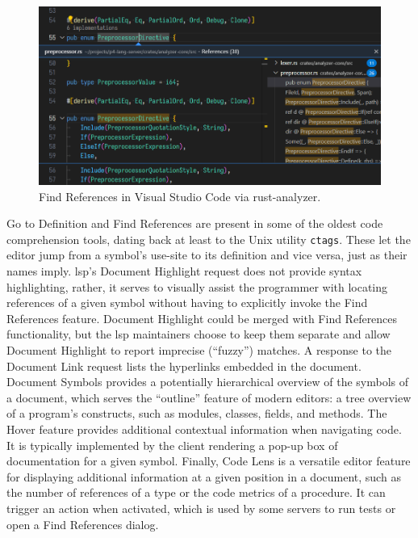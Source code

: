 \begin{figure}[h]
	\includegraphics[width=1.00\textwidth]{resources/code_find_references.png}
	\caption{Find References in Visual Studio Code via rust-analyzer.}
\end{figure}

Go to Definition and Find References are
present in some of the oldest code comprehension tools, dating back at least to
the Unix utility \texttt{ctags}\cite{exuberant-ctags}. These let the editor jump
from a symbol's use-site to its definition and vice versa, just as their names
imply. \acrshort{lsp}'s Document Highlight request does not provide syntax
highlighting, rather, it serves to visually assist the programmer with locating
references of a given symbol without having to explicitly invoke the Find
References feature. Document Highlight could be merged with Find References
functionality, but the \acrshort{lsp} maintainers choose to keep them separate
and allow Document Highlight to report imprecise (``fuzzy'') matches. A response
to the Document Link request lists the hyperlinks embedded in the document.
Document Symbols provides a potentially hierarchical overview of the symbols of
a document, which serves the ``outline'' feature of modern editors: a tree
overview of a program's constructs, such as modules, classes, fields, and
methods. The Hover feature provides additional contextual information when
navigating code. It is typically implemented by the client rendering a pop-up
box of documentation for a given symbol. Finally, Code Lens is a versatile
editor feature for displaying additional information at a given position in a
document, such as the number of references of a type or the code metrics of a
procedure\cite{codelens-comparison}. It can trigger an action when activated,
which is used by some servers to run tests or open a Find References dialog.

